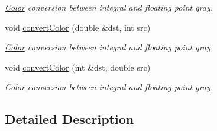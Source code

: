 \begin{DoxyCompactItemize}
\begin{DoxyCompactList}\small\item\em \hyperlink{class_d_o_1_1_color}{Color} conversion between integral and floating point gray. \end{DoxyCompactList}\item 
\hypertarget{group___color_conversion_gacf7ae24078f1be907709c70a71be6127}{void \hyperlink{group___color_conversion_gacf7ae24078f1be907709c70a71be6127}{convert\-Color} (double \&dst, int src)}\label{group___color_conversion_gacf7ae24078f1be907709c70a71be6127}

\begin{DoxyCompactList}\small\item\em \hyperlink{class_d_o_1_1_color}{Color} conversion between integral and floating point gray. \end{DoxyCompactList}\item 
\hypertarget{group___color_conversion_ga86287b233492b328656c5c22f85d0baa}{void \hyperlink{group___color_conversion_ga86287b233492b328656c5c22f85d0baa}{convert\-Color} (int \&dst, double src)}\label{group___color_conversion_ga86287b233492b328656c5c22f85d0baa}

\begin{DoxyCompactList}\small\item\em \hyperlink{class_d_o_1_1_color}{Color} conversion between integral and floating point gray. \end{DoxyCompactList}\end{DoxyCompactItemize}


\subsection{Detailed Description}


